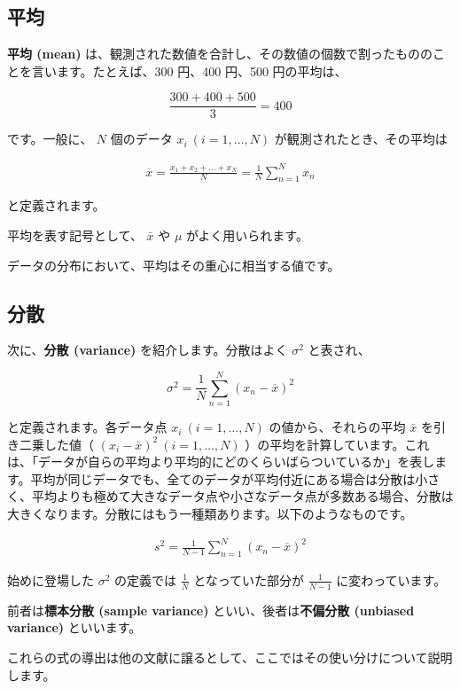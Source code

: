 \subsection{平均}


\textbf{平均 (mean)} は、観測された数値を合計し、その数値の個数で割ったもののことを言います。たとえば、300 円、400 円、500 円の平均は、


\[
\frac{300 + 400 + 500}{3} = 400
\]


です。一般に、 $N$ 個のデータ $x_i \ (i=1,\dots,N)$ が観測されたとき、その平均は


\[
\begin{aligned}
\overline{x}
= \frac{x_1 + x_2 + \dots + x_N}{N}
= \frac{1}{N} \sum^{N}_{n=1} x_{n}
\end{aligned}
\]


と定義されます。

平均を表す記号として、 $\bar{x}$ や $\mu$ がよく用いられます。

データの分布において、平均はその重心に相当する値です。


\subsection{分散}


次に、\textbf{分散 (variance)} を紹介します。分散はよく $\sigma^2$ と表され、


\[
\sigma^2 = \frac{1}{N} \sum_{n=1}^N \left( x_n - \overline{x} \right)^2
\]


と定義されます。各データ点 $x_i \ (i=1,\dots,N)$ の値から、それらの平均 $\bar{x}$ を引き二乗した値（ $(x_i - \bar{x})^2 \ (i=1,\dots,N)$ ）の平均を計算しています。これは、「データが自らの平均より平均的にどのくらいばらついているか」を表します。平均が同じデータでも、全てのデータが平均付近にある場合は分散は小さく、平均よりも極めて大きなデータ点や小さなデータ点が多数ある場合、分散は大きくなります。分散にはもう一種類あります。以下のようなものです。


\[
\begin{aligned}
s^2 = \frac{1}{N - 1} \sum_{n=1}^N \left( x_n - \overline{x} \right)^2
\end{aligned}
\]


始めに登場した $\sigma^2$ の定義では $\frac{1}{N}$ となっていた部分が $\frac{1}{N - 1}$ に変わっています。

前者は\textbf{標本分散 (sample variance)} といい、後者は\textbf{不偏分散 (unbiased variance)} といいます。

これらの式の導出は他の文献に譲るとして、ここではその使い分けについて説明します。


